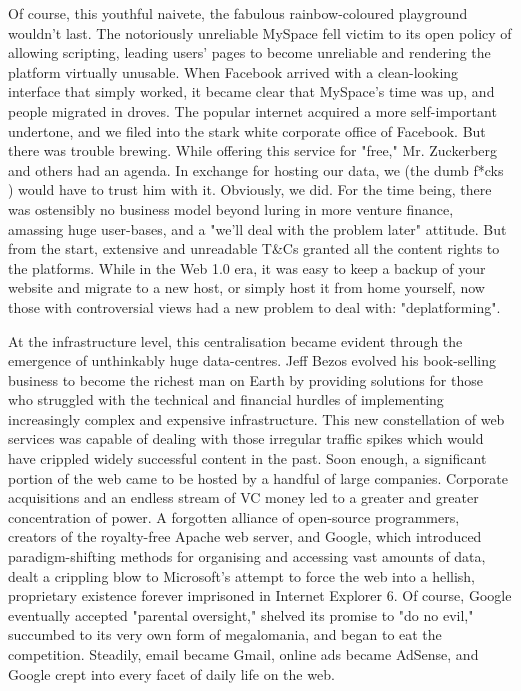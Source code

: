 Of course, this youthful naivete, the fabulous rainbow-coloured playground wouldn't last. The notoriously unreliable MySpace fell victim to its open policy of allowing scripting, leading users' pages to become unreliable and rendering the platform virtually unusable. When Facebook arrived with a clean-looking interface that simply worked, it became clear that MySpace's time was up, and people migrated in droves. The popular internet acquired a more self-important undertone, and we filed into the stark white corporate office of Facebook. But there was trouble brewing. While offering this service for "free," Mr. Zuckerberg and others had an agenda. In exchange for hosting our data, we (the dumb f*cks \cite{carlson2010ims}) would have to trust him with it. Obviously, we did. For the time being, there was ostensibly no business model beyond luring in more venture finance, amassing huge user-bases, and a "we'll deal with the problem later" attitude. But from the start, extensive and unreadable T\&Cs granted all the content rights to the platforms. While in the Web 1.0 era, it was easy to keep a backup of your website and migrate to a new host, or simply host it from home yourself, now those with controversial views had a new problem to deal with: "deplatforming".

At the infrastructure level, this centralisation became evident through the emergence of unthinkably huge data-centres. Jeff Bezos evolved his book-selling business to become the richest man on Earth by providing solutions for those who struggled with the technical and financial hurdles of implementing increasingly complex and expensive infrastructure. This new constellation of web services was capable of dealing with those irregular traffic spikes which would have crippled widely successful content in the past. Soon enough, a significant portion of the web came to be hosted by a handful of large companies. Corporate acquisitions and an endless stream of VC money led to a greater and greater concentration of power. A forgotten alliance of open-source programmers, creators of the royalty-free Apache web server, and Google, which introduced paradigm-shifting methods for organising and accessing vast amounts of data, dealt a crippling blow to Microsoft's attempt to force the web into a hellish, proprietary existence forever imprisoned in Internet Explorer 6. Of course, Google eventually accepted "parental oversight," shelved its promise to "do no evil," succumbed to its very own form of megalomania, and began to eat the competition. Steadily, email became Gmail, online ads became AdSense, and Google crept into every facet of daily life on the web.

